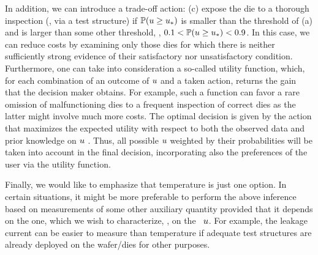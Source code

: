 In addition, we can introduce a trade-off action: (c) expose the die to a thorough inspection (\eg, via a test structure) if $\mathbb{P}(u \geq u_*)$ is smaller than the threshold of (a) and is larger than some other threshold, \eg, $0.1 < \mathbb{P}(u \geq u_*) < 0.9$. In this case, we can reduce costs by examining only those dies for which there is neither sufficiently strong evidence of their satisfactory nor unsatisfactory condition.
Furthermore, one can take into consideration a so-called utility function, which, for each combination of an outcome of $u$ and a taken action, returns the gain that the decision maker obtains.
For example, such a function can favor a rare omission of malfunctioning dies to a frequent inspection of correct dies as the latter might involve much more costs.
The optimal decision is given by the action that maximizes the expected utility with respect to both the observed data and prior knowledge on $u$ \cite{bernardo2007}.
Thus, all possible $u$ weighted by their probabilities will be taken into account in the final decision, incorporating also the preferences of the user via the utility function.

Finally, we would like to emphasize that temperature is just one option.
In certain situations, it might be more preferable to perform the above inference based on measurements of some other auxiliary quantity provided that it depends on the one, which we wish to characterize, \ie, on the \qoi\ $u$.
For example, the leakage current can be easier to measure than temperature if adequate test structures are already deployed on the wafer/dies for other purposes.
